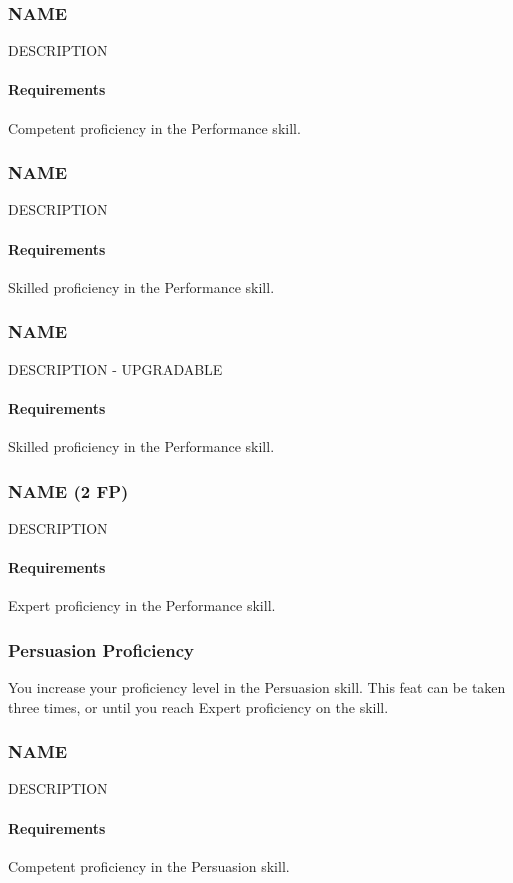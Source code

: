 \subsubsection{NAME} \label{feat::name}
    DESCRIPTION
    \paragraph{Requirements} Competent proficiency in the Performance skill.
\subsubsection{NAME} \label{feat::name}
    DESCRIPTION
    \paragraph{Requirements} Skilled proficiency in the Performance skill.
\subsubsection{NAME} \label{feat::name}
    DESCRIPTION - UPGRADABLE
    \paragraph{Requirements} Skilled proficiency in the Performance skill.
\subsubsection{NAME (2 FP)} \label{feat::name}
    DESCRIPTION
    \paragraph{Requirements} Expert proficiency in the Performance skill.
\subsubsection{Persuasion Proficiency} \label{feat::persuasionprof}
    You increase your proficiency level in the Persuasion skill.
    This feat can be taken three times, or until you reach Expert proficiency on the skill.
\subsubsection{NAME} \label{feat::name}
    DESCRIPTION
    \paragraph{Requirements} Competent proficiency in the Persuasion skill.

